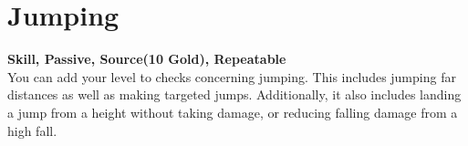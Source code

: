 \section{Jumping}\label{sec:jumping}
\textbf{Skill, Passive, Source(10 Gold), Repeatable}\\
You can add your level to checks concerning jumping.
This includes jumping far distances as well as making targeted jumps.
Additionally, it also includes landing a jump from a height without taking damage, or reducing falling damage from a high fall.